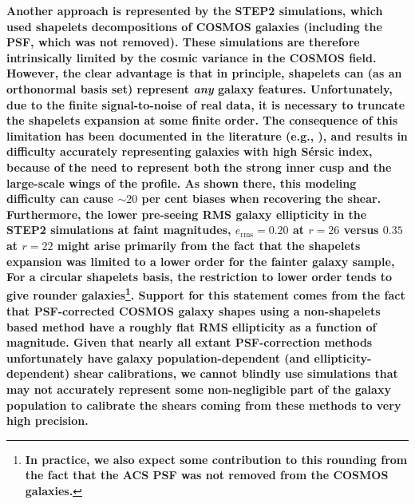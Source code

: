 \documentclass[twocolumn,useAMS,usenatbib]{mn2e}
\newcommand{\reftext}[1]{\textbf{#1}}
\begin{document}
\reftext{Another approach is represented by the STEP2 simulations,
  which used shapelets decompositions of COSMOS galaxies (including
  the PSF, which was not removed).  These simulations are therefore 
  intrinsically limited by the cosmic variance in the COSMOS field.
  However, the clear advantage is that in principle, shapelets can (as
an orthonormal basis set) represent {\em any} galaxy features.
Unfortunately, due to the finite signal-to-noise of real data, it is
necessary to truncate the shapelets expansion at some finite order.
The consequence of this limitation has been documented in the
literature (e.g., \citealt{2010A&A...510A..75M}), and results in 
difficulty accurately representing galaxies with high
S\'ersic index, because of the need to represent both the strong inner
cusp and the large-scale wings of the profile.  As shown there, this
modeling difficulty can cause $\sim 20$ per cent biases when 
recovering the shear.  Furthermore, the lower pre-seeing RMS galaxy
  ellipticity in the STEP2 simulations at faint magnitudes, $e_\mathrm{rms}=0.20$ at $r=26$ versus $0.35$
  at $r=22$ \citep{2007MNRAS.376...13M} might arise primarily from the fact
  that the shapelets expansion was limited to a lower order for the
  fainter galaxy sample,  For a circular shapelets basis, the
  restriction to lower order tends
  to give rounder galaxies\footnote{\reftext{In practice, we also expect some
    contribution to this rounding from the fact that the ACS PSF was
    not removed from the COSMOS galaxies.}}.  Support for
  this statement comes from the fact that PSF-corrected COSMOS galaxy
  shapes using a non-shapelets based method \citep{2007ApJS..172..219L} have a roughly flat RMS
  ellipticity as a function of magnitude.  Given that nearly all extant PSF-correction
methods unfortunately have galaxy
population-dependent (and ellipticity-dependent) shear calibrations, we cannot blindly use
simulations that may not accurately represent some non-negligible
part of the
galaxy population to calibrate the shears coming from these methods to
very high precision.} %
\end{document}
